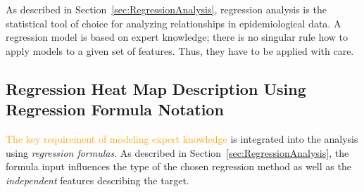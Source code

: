 \documentclass[journal]{style/vgtc} 			          %
\newcommand{\design}[1]{\textcolor{orange}{#1}}
\begin{document}
As described in Section~\ref{sec:RegressionAnalysis}, regression analysis is the statistical tool of choice for analyzing relationships in epidemiological data.
A regression model is based on expert knowledge; there is no singular rule how to apply models to a given set of features. Thus, they have to be applied with care.
\subsection{Regression Heat Map Description Using Regression Formula Notation}
\design{The key requirement of modeling expert knowledge} is integrated into the analysis using \emph{regression formulas}.
As described in Section~\ref{sec:RegressionAnalysis}, the formula input influences the type of the chosen regression method as well as the \emph{independent} features describing the target.
\end{document}
